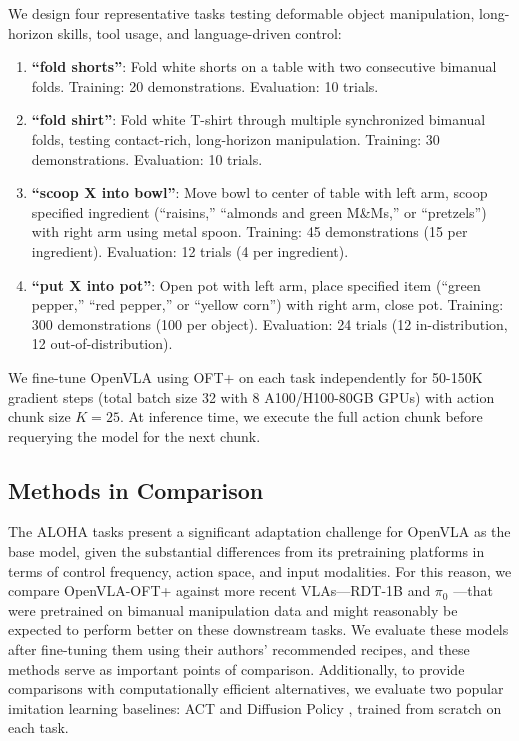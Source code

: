 \documentclass[conference]{IEEEtran}
\begin{document}
We design four representative tasks testing deformable object manipulation, long-horizon skills, tool usage, and language-driven control:
\begin{enumerate}
    \item \textbf{``fold shorts''}: Fold white shorts on a table with two consecutive bimanual folds. Training: 20 demonstrations. Evaluation: 10 trials.
    \item \textbf{``fold shirt''}: Fold white T-shirt through multiple synchronized bimanual folds, testing contact-rich, long-horizon manipulation. Training: 30 demonstrations. Evaluation: 10 trials.
    \item \textbf{``scoop X into bowl''}: Move bowl to center of table with left arm, scoop specified ingredient (``raisins,'' ``almonds and green M\&Ms,'' or ``pretzels'') with right arm using metal spoon. Training: 45 demonstrations (15 per ingredient). Evaluation: 12 trials (4 per ingredient).
    \item \textbf{``put X into pot''}: Open pot with left arm, place specified item (``green pepper,'' ``red pepper,'' or ``yellow corn'') with right arm, close pot. Training: 300 demonstrations (100 per object). Evaluation: 24 trials (12 in-distribution, 12 out-of-distribution).
\end{enumerate}

We fine-tune OpenVLA using OFT+ on each task independently for 50-150K gradient steps (total batch size 32 with 8 A100/H100-80GB GPUs) with action chunk size $K=25$. At inference time, we execute the full action chunk before requerying the model for the next chunk.



\subsection{Methods in Comparison}

The ALOHA tasks present a significant adaptation challenge for OpenVLA as the base model, given the substantial differences from its pretraining platforms in terms of control frequency, action space, and input modalities. For this reason, we compare OpenVLA-OFT+ against more recent VLAs---RDT-1B \citep{liu2024rdt} and $\pi_0$ \citep{black2024pi_0}---that were pretrained on bimanual manipulation data and might reasonably be expected to perform better on these downstream tasks. We evaluate these models after fine-tuning them using their authors' recommended recipes, and these methods serve as important points of comparison. Additionally, to provide comparisons with computationally efficient alternatives, we evaluate two popular imitation learning baselines: ACT \citep{zhao2023learning} and Diffusion Policy \citep{chi2023diffusion}, trained from scratch on each task.
\end{document}

